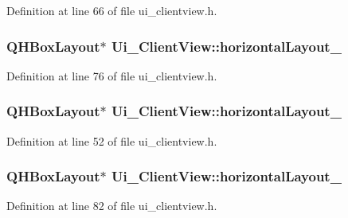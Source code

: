 Definition at line 66 of file ui\+\_\+clientview.\+h.

\hypertarget{class_ui___client_view_aed82dc8f9f66b2148ec2d902cb69feb1}{}
\subsubsection[{horizontal\+Layout\+\_\+2}]{\setlength{\rightskip}{0pt plus 5cm}Q\+H\+Box\+Layout$\ast$ Ui\+\_\+\+Client\+View\+::horizontal\+Layout\+\_}\label{class_ui___client_view_aed82dc8f9f66b2148ec2d902cb69feb1}


Definition at line 76 of file ui\+\_\+clientview.\+h.

\hypertarget{class_ui___client_view_a6d05cb485ccdd95c9c055e8e8b83ac56}{}
\subsubsection[{horizontal\+Layout\+\_\+3}]{\setlength{\rightskip}{0pt plus 5cm}Q\+H\+Box\+Layout$\ast$ Ui\+\_\+\+Client\+View\+::horizontal\+Layout\+\_}\label{class_ui___client_view_a6d05cb485ccdd95c9c055e8e8b83ac56}


Definition at line 52 of file ui\+\_\+clientview.\+h.

\hypertarget{class_ui___client_view_a86c70e5ff3d118a228d6010bfaa302d6}{}
\subsubsection[{horizontal\+Layout\+\_\+4}]{\setlength{\rightskip}{0pt plus 5cm}Q\+H\+Box\+Layout$\ast$ Ui\+\_\+\+Client\+View\+::horizontal\+Layout\+\_}\label{class_ui___client_view_a86c70e5ff3d118a228d6010bfaa302d6}


Definition at line 82 of file ui\+\_\+clientview.\+h.

\hypertarget{class_ui___client_view_a320d512fe1c190255fadb042dee71aa8}{}

